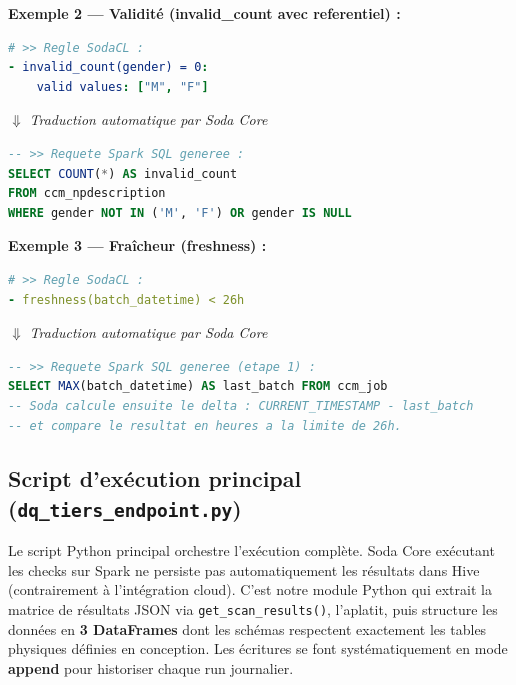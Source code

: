 \medskip
\noindent\textbf{Exemple 2 — Validité (invalid\_count avec referentiel) :}
\begin{lstlisting}[language=YAML]
# >> Regle SodaCL :
- invalid_count(gender) = 0:
    valid values: ["M", "F"]
\end{lstlisting}
\begin{center}$\Downarrow$ \textit{Traduction automatique par Soda Core}\end{center}
\begin{lstlisting}[language=SQL]
-- >> Requete Spark SQL generee :
SELECT COUNT(*) AS invalid_count
FROM ccm_npdescription
WHERE gender NOT IN ('M', 'F') OR gender IS NULL
\end{lstlisting}

\medskip
\noindent\textbf{Exemple 3 — Fraîcheur (freshness) :}
\begin{lstlisting}[language=YAML]
# >> Regle SodaCL :
- freshness(batch_datetime) < 26h
\end{lstlisting}
\begin{center}$\Downarrow$ \textit{Traduction automatique par Soda Core}\end{center}
\begin{lstlisting}[language=SQL]
-- >> Requete Spark SQL generee (etape 1) :
SELECT MAX(batch_datetime) AS last_batch FROM ccm_job
-- Soda calcule ensuite le delta : CURRENT_TIMESTAMP - last_batch
-- et compare le resultat en heures a la limite de 26h.
\end{lstlisting}

\subsection{Script d'exécution principal (\texttt{dq\_tiers\_endpoint.py})}

Le script Python principal orchestre l'exécution complète. Soda Core exécutant les checks sur Spark ne persiste pas automatiquement les résultats dans Hive (contrairement à l'intégration cloud). C'est notre module Python qui extrait la matrice de résultats JSON via \texttt{get\_scan\_results()}, l'aplatit, puis structure les données en \textbf{3 DataFrames} dont les schémas respectent exactement les tables physiques définies en conception. Les écritures se font systématiquement en mode \textbf{append} pour historiser chaque run journalier.


